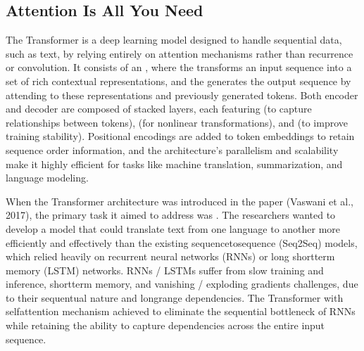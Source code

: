 \documentclass[letterpaper,11pt,english]{sphinxmanual}
\begin{document}
\subsection{Attention Is All You Need}
\label{\detokenize{pretraining:attention-is-all-you-need}}
\sphinxAtStartPar
The Transformer is a deep learning model designed to handle sequential
data, such as text, by relying entirely on attention mechanisms rather
than recurrence or convolution. It consists of an , where the  transforms an input sequence into a
set of rich contextual representations, and the  generates
the output sequence by attending to these representations and previously
generated tokens. Both encoder and decoder are composed of stacked
layers, each featuring  (to capture
relationships between tokens),  (for
non\sphinxhyphen{}linear transformations), and  (to improve training stability). Positional encodings
are added to token embeddings to retain sequence order information, and
the architecture’s parallelism and scalability make it highly efficient
for tasks like machine translation, summarization, and language
modeling.

\sphinxAtStartPar
When the Transformer architecture was introduced in the paper
 (Vaswani et al., 2017), the primary task
it aimed to address was . The researchers wanted
to develop a model that could translate text from one language to
another more efficiently and effectively than the existing
sequence\sphinxhyphen{}to\sphinxhyphen{}sequence (Seq2Seq) models, which relied heavily on recurrent
neural networks (RNNs) or long short\sphinxhyphen{}term memory (LSTM) networks. RNNs /
LSTMs suffer from slow training and inference, short\sphinxhyphen{}term memory, and
vanishing / exploding gradients challenges, due to their sequentual
nature and long\sphinxhyphen{}range dependencies. The Transformer with self\sphinxhyphen{}attention
mechanism achieved to eliminate the sequential bottleneck of RNNs while
retaining the ability to capture dependencies across the entire input
sequence.
\end{document}
